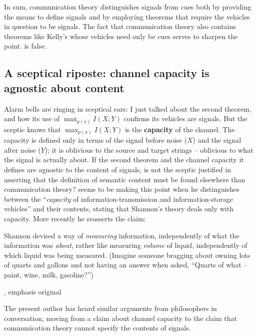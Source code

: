 \documentclass[12pt]{article}
\begin{document}
In sum, communication theory distinguishes signals from cues both by providing the means to define signals and by employing theorems that require the vehicles in question to be signals.
The fact that communication theory also contains theorems like Kelly's whose vehicles need only be cues serves to sharpen the point.
\act{} is false.

\subsection{A sceptical riposte: channel capacity is agnostic about content}

Alarm bells are ringing in sceptical ears: I just talked about the second theorem, and how its use of $\max_{p(x)}I(X;Y)$ confirms its vehicles are signals.
But the sceptic knows that $\max_{p(x)}I(X;Y)$ is the \textbf{capacity} of the channel.
The capacity is defined only in terms of the signal before noise ($X$) and the signal after noise ($Y$); it is oblivious to the source and target strings -- oblivious to what the signal is actually about.
If the second theorem and the channel capacity it defines are agnostic to the content of signals, is not the sceptic justified in asserting that the definition of semantic content must be found elsewhere than communication theory?
\citet[344]{dennett1983intentional} seems to be making this point when he distinguishes between the ``\textit{capacity} of information-transmission and information-storage vehicles'' and their contents, stating that Shannon's theory deals only with capacity.
More recently he reasserts the claim:

\begin{myquote}
Shannon devised a way of \textit{measuring} information, independently of what the information was \textit{about}, rather like measuring \textit{volume} of liquid, independently of which liquid was being measured. (Imagine someone bragging about owning lots of quarts and gallons and not having an answer when asked, ``Quarts of what -- paint, wine, milk, gasoline?'')
\par\hspace*{\fill}\citet[106]{dennett2017bacteria}, emphasis original
\end{myquote}

\noindent The present author has heard similar arguments from philosophers in conversation, moving from a claim about channel capacity to the claim that communication theory cannot specify the contents of signals.
\end{document}
